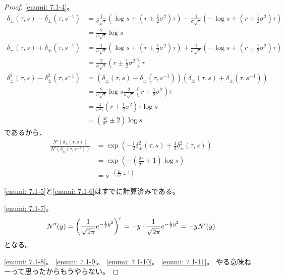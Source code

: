 \documentclass[uplatex]{jsarticle}
\theoremstyle{definition}
\begin{document}
\begin{proof}
  \ref{enumi: 7.1-4}。
  \begin{align*}
    \delta_{\pm}(\tau,s) - \delta_{\pm}(\tau,s^{-1})
    &= \frac{1}{\sigma\sqrt{\tau}}\left( \log s + \left(
    r \pm \frac{1}{2}\sigma^2\right)\tau \right)
    - \frac{1}{\sigma\sqrt{\tau}}\left( - \log s + \left(
    r \pm \frac{1}{2}\sigma^2\right)\tau \right) \\
    &= \frac{2}{\sigma\sqrt{\tau}}\log s \\
    \delta_{\pm}(\tau,s) + \delta_{\pm}(\tau,s^{-1})
    &= \frac{1}{\sigma\sqrt{\tau}}\left( \log s + \left(
    r \pm \frac{1}{2}\sigma^2\right)\tau \right)
    + \frac{1}{\sigma\sqrt{\tau}}\left( - \log s + \left(
    r \pm \frac{1}{2}\sigma^2\right)\tau \right) \\
    &= \frac{2}{\sigma\sqrt{\tau}}\left(
    r \pm \frac{1}{2}\sigma^2\right)\tau \\
    \delta_{\pm}^2(\tau,s) - \delta_{\pm}^2(\tau,s^{-1})
    &= \left( \delta_{\pm}(\tau,s) - \delta_{\pm}(\tau,s^{-1}) \right)
    \left( \delta_{\pm}(\tau,s) + \delta_{\pm}(\tau,s^{-1}) \right) \\
    &= \frac{2}{\sigma\sqrt{\tau}}\log s
    \frac{2}{\sigma\sqrt{\tau}}\left(
    r \pm \frac{1}{2}\sigma^2\right)\tau \\
    &= \frac{4}{\sigma^2\tau}\left(
    r \pm \frac{1}{2}\sigma^2\right)\tau \log s \\
    &= \left(\frac{4r}{\sigma^2} \pm 2\right) \log s
  \end{align*}
  であるから、
  \begin{align*}
    \frac{N'(\delta_{\pm}(\tau,s))}{N'(\delta_{\pm}(\tau,s^{-1}))}
    &= \exp \left( - \frac{1}{2}\delta_{\pm}^2(\tau,s)
    + \frac{1}{2}\delta_{\pm}^2(\tau,s)\right) \\
    &= \exp \left( - \left(\frac{2r}{\sigma^2} \pm 1\right) \log s\right) \\
    &= s^{- \left(\frac{2r}{\sigma^2} \pm 1\right)}
  \end{align*}

  \ref{enumi: 7.1-5}と\ref{enumi: 7.1-6}はすでに計算済みである。

  \ref{enumi: 7.1-7}。
  \[
  N''(y)
  = \left( \frac{1}{\sqrt{2\pi}}e^{-\frac{1}{2}y^2}\right)' \\
  = -y\cdot \frac{1}{\sqrt{2\pi}}e^{-\frac{1}{2}y^2} \\
  = -yN'(y)
  \]
  となる。

  \ref{enumi: 7.1-8}。
  \ref{enumi: 7.1-9}。
  \ref{enumi: 7.1-10}。
  \ref{enumi: 7.1-11}。
  やる意味ねーって思ったからもうやらない。
\end{proof}
\end{document}
